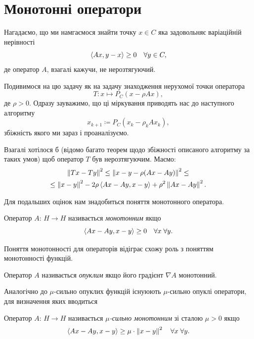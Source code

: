 \section{Монотонні оператори}

Нагадаємо, що ми намгаємося знайти точку $x \in C$ яка задовольняє варіаційній нерівності
\begin{equation}
    \sp{A x, y - x} \ge 0 \quad \forall y \in C,
\end{equation}
де оператор $A$, взагалі кажучи, не нерозтягуючий. \medskip

Подивимося
на цю задачу як на задачу знаходження нерухомої точки оператора
\begin{equation}
    T: x \mapsto P_C \left( x - \rho A x \right),
\end{equation}
де $\rho > 0$. Одразу зауважимо, що ці міркування приводять нас до наступного алгоритму
\begin{equation}
    x_{k + 1} \coloneqq P_C \left( x_k - \rho_k A x_k \right),
\end{equation} 
збіжність якого ми зараз і проаналізуємо. \medskip

Взагалі хотілося б (відомо багато теорем щодо збіжності описаного алгоритму за таких умов) щоб оператор $T$ був нерозтягуючим. Маємо:
\begin{multline}
    \no{T x - T y}^2 \le \no{x - y - \rho (A x - A y)}^2 \le \\
    \le \no{x - y}^2 - 2 \rho \sp{A x - A y, x - y} + \rho^2 \no{A x - Ay}^2.
\end{multline}

Для подальших оцінок нам знадобиться поняття монотонного оператора.

\begin{definition}
    Оператор $A$: $H \to H$ називається \emph{монотонним} якщо
    \begin{equation}
        \sp{A x - A y, x - y} \ge 0 \quad \forall x \; \forall y.
    \end{equation}
\end{definition}

Поняття монотонності для операторів відіграє схожу роль з поняттям монотонності функцій.

\begin{example}
    Оператор $A$ називається \emph{опуклим} якщо його градієнт $\nabla A$ монотонний.
\end{example}

Аналогічно до $\mu$-сильно опуклих функцій існуюють $\mu$-сильно опуклі оператори, для визначення яких вводиться
\begin{definition}
    Оператор $A$: $H \to H$ називається \textit{$\mu$-сильно монотонним} зі сталою $\mu > 0$ якщо
    \begin{equation}
        \sp{A x - A y, x - y} \ge \mu \cdot \no{x - y}^2 \quad \forall x \; \forall y.
    \end{equation}
\end{definition}

